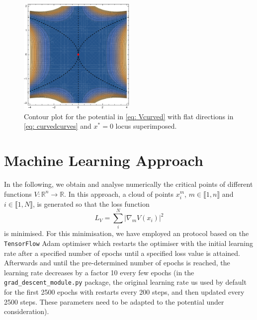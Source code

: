 \documentclass[11pt]{article}
\begin{document}
%
\begin{figure}
	\centering
	\includegraphics[width=0.5\textwidth]{Figures/V3curved.pdf}
	\caption{Contour plot for the potential in \eqref{eq: Vcurved} with flat directions in \eqref{eq: curvedcurves} and $x^*=0$ locus superimposed.}
	\label{fig: curvedflat}
\end{figure}
%


\section{Machine Learning Approach} \label{sec: MLapproach}

In the following, we obtain and analyse numerically the critical points of different functions $V: \mathbb{R}^n\rightarrow\mathbb{R}$. 
In this approach, a cloud of points $x_i^m$, $m\in\llbracket1,n\rrbracket$ and $i\in\llbracket1,N\rrbracket$,
is generated so that the loss function
%
\begin{equation}	\label{eq: loss_cloud}
	L_{V}=\sum_i^N\vert \nabla_m V(x_i)\vert^2
\end{equation}
%
is minimised. 
For this minimisation, we have employed an protocol based on the \texttt{TensorFlow} Adam optimiser 
which restarts the optimiser with the initial learning rate after a specified number of epochs until a specified loss value is attained.
Afterwards and until the pre-determined number of epochs is reached, the learning rate decreases by a factor 10 every few epochs 
(in the \texttt{grad\_descent\_module.py} package, the original learning rate us used by default for the first 2500 epochs with restarts every 200
steps, and then updated every 2500 steps. These parameters need to be adapted to the potential under consideration).
\end{document}
